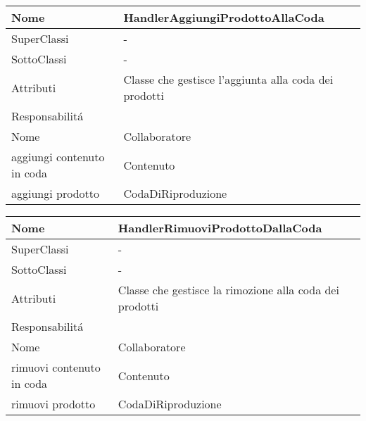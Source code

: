 \begin{center}
    \begin{tabular}{ |p{3cm}|p{3cm}|p{3cm}|p{3cm}| }
        \hline
        Nome & \multicolumn{3}{|p{9cm}|}{HandlerAggiungiProdottoAllaCoda} \\\hline
        SuperClassi & \multicolumn{3}{|p{9cm}|}{-} \\\hline
        SottoClassi & \multicolumn{3}{|p{9cm}|}{-} \\\hline
        Attributi & \multicolumn{3}{|p{9cm}|}{Classe che gestisce l'aggiunta alla coda dei prodotti} \\\hline
        \multicolumn{4}{|p{12cm}|}{Responsabilit\'a} \\\hline
        \multicolumn{2}{|p{6cm}|}{Nome} & \multicolumn{2}{|p{6cm}|}{Collaboratore} \\\hline
        \multicolumn{2}{|p{6cm}|}{aggiungi contenuto in coda} & \multicolumn{2}{|p{6cm}|}{Contenuto} \\\hline
        \multicolumn{2}{|p{6cm}|}{aggiungi prodotto} & \multicolumn{2}{|p{6cm}|}{CodaDiRiproduzione} \\\hline
    \end{tabular}
\end{center}

\begin{center}
    \begin{tabular}{ |p{3cm}|p{3cm}|p{3cm}|p{3cm}| }
        \hline
        Nome & \multicolumn{3}{|p{9cm}|}{HandlerRimuoviProdottoDallaCoda} \\\hline
        SuperClassi & \multicolumn{3}{|p{9cm}|}{-} \\\hline
        SottoClassi & \multicolumn{3}{|p{9cm}|}{-} \\\hline
        Attributi & \multicolumn{3}{|p{9cm}|}{Classe che gestisce la rimozione alla coda dei prodotti} \\\hline
        \multicolumn{4}{|p{12cm}|}{Responsabilit\'a} \\\hline
        \multicolumn{2}{|p{6cm}|}{Nome} & \multicolumn{2}{|p{6cm}|}{Collaboratore} \\\hline
        \multicolumn{2}{|p{6cm}|}{rimuovi contenuto in coda} & \multicolumn{2}{|p{6cm}|}{Contenuto} \\\hline
        \multicolumn{2}{|p{6cm}|}{rimuovi prodotto} & \multicolumn{2}{|p{6cm}|}{CodaDiRiproduzione} \\\hline
    \end{tabular}
\end{center}

